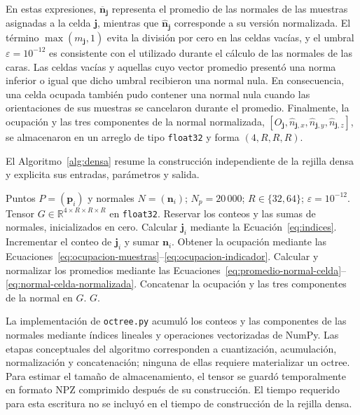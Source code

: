 En estas expresiones, $\overline{\mathbf n}_{\mathbf j}$ representa
el promedio de las normales de las muestras asignadas a la celda
$\mathbf j$, mientras que $\widehat{\mathbf n}_{\mathbf j}$
corresponde a su versión normalizada. El término
$\max(m_{\mathbf j},1)$ evita la división por cero en las celdas
vacías, y el umbral $\varepsilon=10^{-12}$ es consistente con el
utilizado durante el cálculo de las normales de las caras. Las celdas
vacías y aquellas cuyo vector promedio presentó una norma inferior o
igual que dicho umbral recibieron una normal nula. En consecuencia,
una celda ocupada también pudo contener una normal nula cuando las
orientaciones de sus muestras se cancelaron durante el promedio.
Finalmente, la ocupación y las tres componentes de la normal
normalizada,
$\left[O_{\mathbf j},
\widehat n_{\mathbf j,x},
\widehat n_{\mathbf j,y},
\widehat n_{\mathbf j,z}\right]$,
se almacenaron en un arreglo de tipo \texttt{float32} y forma
$(4,R,R,R)$.

El Algoritmo~\ref{alg:densa} resume la construcción independiente de la rejilla densa y explicita sus entradas, parámetros y salida.
\begin{algorithm}[H]
\caption{Construcción directa de la rejilla densa.}
\label{alg:densa}
\begin{algorithmic}[1]
\Require Puntos $P=(\mathbf p_i)$ y normales $N=(\mathbf n_i)$; $N_p=20\,000$; $R\in\{32,64\}$; $\varepsilon=10^{-12}$.
\Ensure Tensor $G\in\mathbb R^{4\times R\times R\times R}$ en \texttt{float32}.
\State Reservar los conteos y las sumas de normales, inicializados en cero.
    \State Calcular $\mathbf j_i$ mediante la Ecuación~\eqref{eq:indices}.
    \State Incrementar el conteo de $\mathbf j_i$ y sumar $\mathbf n_i$.
\EndFor
\State Obtener la ocupación mediante las Ecuaciones~\eqref{eq:ocupacion-muestras}--\eqref{eq:ocupacion-indicador}.
\State Calcular y normalizar los promedios mediante las Ecuaciones~\eqref{eq:promedio-normal-celda}--\eqref{eq:normal-celda-normalizada}.
\State Concatenar la ocupación y las tres componentes de la normal en $G$.
\State \Return $G$.
\end{algorithmic}
\end{algorithm}

La implementación de \texttt{octree.py} acumuló los conteos y las componentes de las normales mediante índices lineales y operaciones vectorizadas de NumPy. Las etapas conceptuales del algoritmo corresponden a cuantización, acumulación, normalización y concatenación; ninguna de ellas requiere materializar un octree. Para estimar el tamaño de almacenamiento, el tensor se guardó temporalmente en formato NPZ comprimido después de su construcción. El tiempo requerido para esta escritura no se incluyó en el tiempo de construcción de la rejilla densa.

